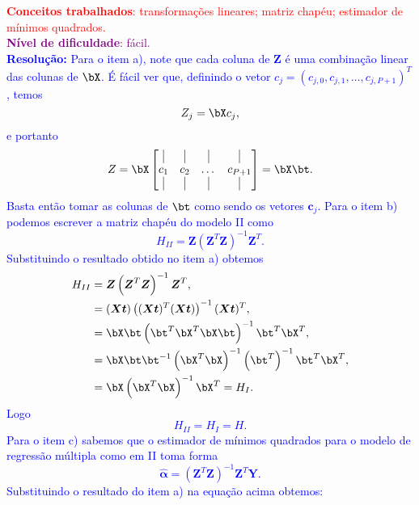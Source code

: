 \textcolor{red}{\textbf{Conceitos trabalhados}: transformações lineares; matriz chapéu; estimador de mínimos quadrados.}\\ \textcolor{purple}{\textbf{Nível de dificuldade}: fácil.}\\
\textcolor{blue}{
\textbf{Resolução:}
Para o item a), note que cada coluna de $\boldsymbol{Z}$ é uma combinação linear das colunas de $\bX$. É fácil ver que, definindo o vetor $c_j = (c_{j,0},c_{j,1}, \dots, c_{j,P+1})^T$, temos 
\begin{equation*}
    Z_j = \bX c_j,
\end{equation*}
e portanto
\begin{equation*}
    Z = \bX \begin{bmatrix}\vline & \vline&\vline&\vline \\ c_1&c_2&\dots&c_{P+1} \\ \vline&\vline&\vline&\vline \end{bmatrix} = \bX \bt.
\end{equation*}
Basta então tomar as colunas de $\bt$ como sendo os vetores $\boldsymbol{c}_j$.
Para o item b) podemos escrever a matriz chapéu do modelo II como 
\begin{equation*}
    H_{II} = \boldsymbol{Z} \left(\boldsymbol{Z}^T\boldsymbol{Z} \right)^{-1} \boldsymbol{Z}^T.
\end{equation*}
Substituindo o resultado obtido no item a) obtemos
\begin{align*}
    H_{II} &= \boldsymbol{Z} \left(\boldsymbol{Z}^T\boldsymbol{Z} \right)^{-1} \boldsymbol{Z}^T, \\
    &= (\boldsymbol{Xt}) \left((\boldsymbol{Xt})^T(\boldsymbol{Xt}) \right)^{-1} (\boldsymbol{Xt})^T, \\
    &= \bX \bt \left(\bt^T \bX^T \bX \bt\right)^{-1}\bt^T \bX^T, \\
    &= \bX \bt \bt^{-1} \left( \bX^T \bX \right)^{-1} \left(\bt^{T}\right)^{-1} \bt^T \bX^T, \\
    &= \bX \left( \bX^T \bX \right)^{-1} \bX^T = H_{I}.
\end{align*}
Logo $$H_{II} = H_{I} = H.$$
Para o item c) sabemos que o estimador de mínimos quadrados para o modelo de regressão múltipla como em II toma forma 
\begin{equation*}
    \hat{\boldsymbol{\alpha}} = \left( \boldsymbol{Z}^T\boldsymbol{Z}\right)^{-1}\boldsymbol{Z}^T \boldsymbol{Y}.
\end{equation*}
Substituindo o resultado do item a) na equação acima obtemos:
\begin{align*}

\end{align*}}
